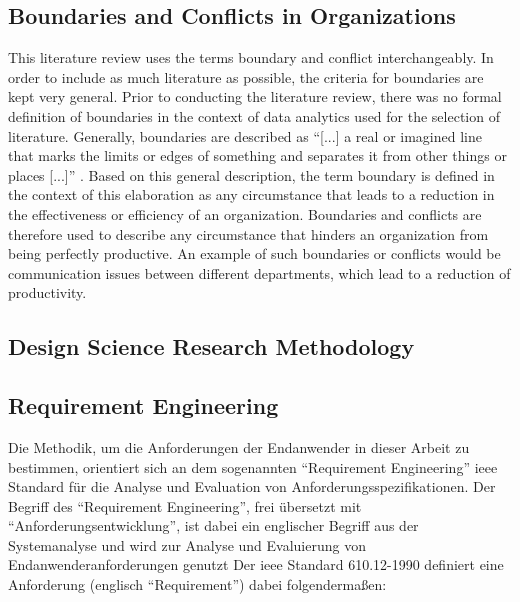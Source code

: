 \subsection{Boundaries and Conflicts in Organizations}

This literature review uses the terms boundary and conflict interchangeably. In order to include as much literature as possible, the criteria for boundaries are kept very general. Prior to conducting the literature review, there was no formal definition of boundaries in the context of data analytics used for the selection of literature. Generally, boundaries are described as \enquote{[...] a real or imagined line that marks the limits or edges of something and separates it from other things or places [...]} \parencite{Hornby.2015}. Based on this general description, the term boundary is defined in the context of this elaboration as any circumstance that leads to a reduction in the effectiveness or efficiency of an organization. %
Boundaries and conflicts are therefore used to describe any circumstance that hinders an organization from being perfectly productive. An example of such boundaries or conflicts would be communication issues between different departments, which lead to a reduction of productivity.

\subsection{Design Science Research Methodology}

\subsection{Requirement Engineering}

Die Methodik, um die Anforderungen der Endanwender in dieser Arbeit zu bestimmen, orientiert sich an dem sogenannten \enquote{Requirement Engineering}  \ac{ieee} Standard  für die Analyse und Evaluation von Anforderungsspezifikationen. \parencite[Vgl.][S.2]{SWEBOK.2004} Der Begriff des \enquote{Requirement Engineering}, frei übersetzt mit \enquote{Anforderungsentwicklung}, ist dabei ein englischer Begriff aus der Systemanalyse und wird zur Analyse und Evaluierung von Endanwenderanforderungen genutzt \parencite[Vgl.][S.82-111]{Sommerville.2011} Der \ac{ieee} Standard 610.12-1990 definiert eine Anforderung (englisch \enquote{Requirement}) dabei folgendermaßen: %


